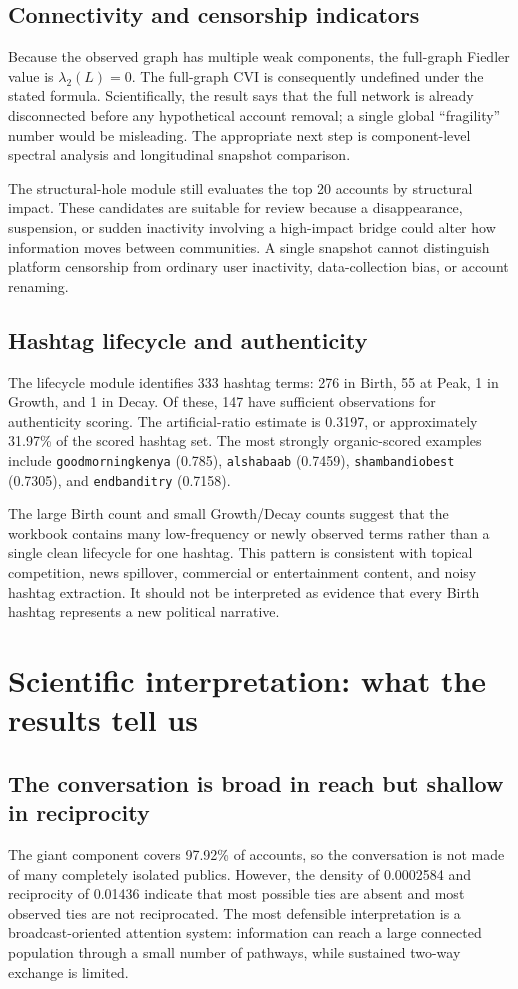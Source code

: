\documentclass[11pt]{article}
\begin{document}
\subsection{Connectivity and censorship indicators}
Because the observed graph has multiple weak components, the full-graph Fiedler value is $\lambda_2(L)=0$. The full-graph CVI is consequently undefined under the stated formula. Scientifically, the result says that the full network is already disconnected before any hypothetical account removal; a single global ``fragility'' number would be misleading. The appropriate next step is component-level spectral analysis and longitudinal snapshot comparison.

The structural-hole module still evaluates the top 20 accounts by structural impact. These candidates are suitable for review because a disappearance, suspension, or sudden inactivity involving a high-impact bridge could alter how information moves between communities. A single snapshot cannot distinguish platform censorship from ordinary user inactivity, data-collection bias, or account renaming.

\subsection{Hashtag lifecycle and authenticity}
The lifecycle module identifies 333 hashtag terms: 276 in Birth, 55 at Peak, 1 in Growth, and 1 in Decay. Of these, 147 have sufficient observations for authenticity scoring. The artificial-ratio estimate is 0.3197, or approximately 31.97\% of the scored hashtag set. The most strongly organic-scored examples include \texttt{goodmorningkenya} (0.785), \texttt{alshabaab} (0.7459), \texttt{shambandiobest} (0.7305), and \texttt{endbanditry} (0.7158).

The large Birth count and small Growth/Decay counts suggest that the workbook contains many low-frequency or newly observed terms rather than a single clean lifecycle for one hashtag. This pattern is consistent with topical competition, news spillover, commercial or entertainment content, and noisy hashtag extraction. It should not be interpreted as evidence that every Birth hashtag represents a new political narrative.

\section{Scientific interpretation: what the results tell us}

\subsection{The conversation is broad in reach but shallow in reciprocity}
The giant component covers 97.92\% of accounts, so the conversation is not made of many completely isolated publics. However, the density of 0.0002584 and reciprocity of 0.01436 indicate that most possible ties are absent and most observed ties are not reciprocated. The most defensible interpretation is a broadcast-oriented attention system: information can reach a large connected population through a small number of pathways, while sustained two-way exchange is limited.
\end{document}
